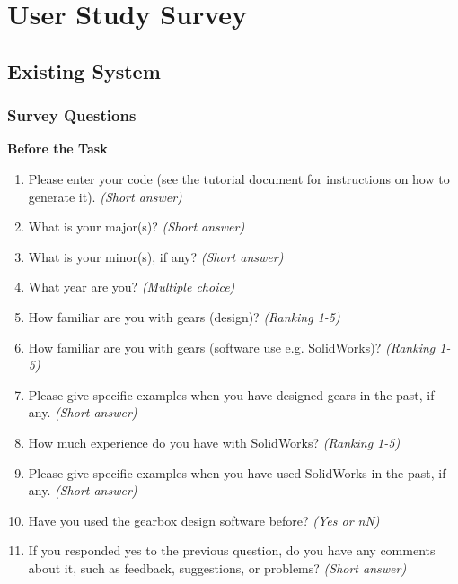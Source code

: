 \section{User Study Survey}
\label{app:survey}
\subsection{Existing System}

\subsubsection{Survey Questions}

\noindent\textbf{Before the Task}
\begin{enumerate}
    \item Please enter your code (see the tutorial document for instructions on how to generate it). \emph{(Short answer)}
    \item What is your major(s)? \emph{(Short answer)}
    \item What is your minor(s), if any? \emph{(Short answer)}
    \item What year are you? \emph{(Multiple choice)}
    \item How familiar are you with gears (design)? \emph{(Ranking 1-5)}
    \item How familiar are you with gears (software use e.g. SolidWorks)? \emph{(Ranking 1-5)}
    \item Please give specific examples when you have designed gears in the past, if any. \emph{(Short answer)}
    \item How much experience do you have with SolidWorks? \emph{(Ranking 1-5)}
    \item Please give specific examples when you have used SolidWorks in the past, if any. \emph{(Short answer)}
    \item Have you used the gearbox design software before? \emph{(Yes or nN)}
    \item If you responded yes to the previous question, do you have any comments about it, such as feedback, suggestions, or problems? \emph{(Short answer)}
\end{enumerate}

